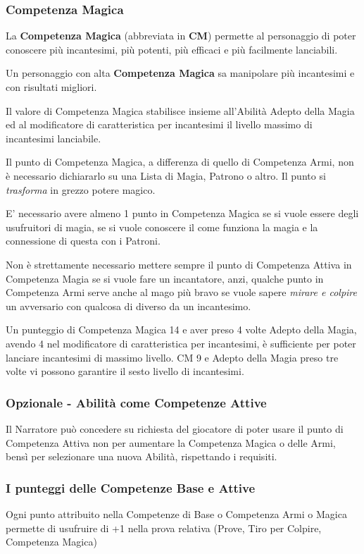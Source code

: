 \begin{multicols}{2}
\subsubsection{Competenza Magica}\label{competenzamagica}

La \textbf{Competenza Magica} (abbreviata in \textbf{CM}) permette al personaggio di poter conoscere più incantesimi, più potenti, più efficaci e più facilmente lanciabili.

Un personaggio con alta \textbf{Competenza Magica} sa manipolare più incantesimi e con risultati migliori.

Il valore di Competenza Magica stabilisce insieme all'Abilità Adepto della Magia ed al modificatore di caratteristica per incantesimi il livello massimo di incantesimi lanciabile.

Il punto di Competenza Magica, a differenza di quello di Competenza Armi, non è necessario dichiararlo su una Lista di Magia, Patrono o altro. Il punto si \emph{trasforma} in grezzo potere magico.

E' necessario avere almeno 1 punto in Competenza Magica se si vuole essere degli usufruitori di magia, se si vuole conoscere il come funziona la magia e la connessione di questa con i Patroni.

Non è strettamente necessario mettere sempre il punto di Competenza Attiva in Competenza Magia se si vuole fare un incantatore, anzi, qualche punto in Competenza Armi serve anche al mago più bravo se vuole sapere \emph{mirare e colpire} un avversario con qualcosa di diverso da un incantesimo.

Un punteggio di Competenza Magica 14 e aver preso 4 volte Adepto della Magia, avendo 4 nel modificatore di caratteristica per incantesimi, è sufficiente per poter lanciare incantesimi di massimo livello. CM 9 e Adepto della Magia preso tre volte vi possono garantire il sesto livello di incantesimi.

\subsubsection{Opzionale - Abilità come Competenze Attive}

Il Narratore può concedere su richiesta del giocatore di poter usare il punto di Competenza Attiva non per aumentare la Competenza Magica o delle Armi, bensì per selezionare una nuova Abilità, rispettando i requisiti.

\subsubsection{I punteggi delle Competenze Base e Attive}\label{punteggicompetenzebaseattive}

Ogni punto attribuito nella Competenze di Base o Competenza Armi o Magica permette di usufruire di +1 nella prova relativa (Prove, Tiro per Colpire, Competenza Magica)

\end{multicols}

